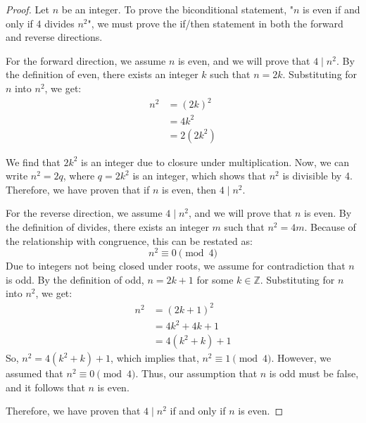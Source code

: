 \documentclass[12pt]{article}
\theoremstyle{definition}
\begin{document}
\begin{proof}
    Let \( n \) be an integer. To prove the biconditional statement, "\( n \) is even if and only if 4 divides \( n^2 \)", we must prove the if/then statement in both the forward and reverse directions.

    \vspace{1em}

    For the forward direction, we assume \( n \) is even, and we will prove that \( 4 \mid n^2 \). By the definition of even, there exists an integer \( k \) such that \( n = 2k \). Substituting for \( n \) into \( n^2 \), we get:
    \begin{align*}
        n^2 &= (2k)^2 \\
             &= 4k^2 \\
             &= 2(2k^2)
    \end{align*}

    We find that \( 2k^2 \) is an integer due to closure under multiplication. Now, we can write \( n^2 = 2q \), where \( q = 2k^2 \) is an integer, which shows that \( n^2 \) is divisible by 4. Therefore, we have proven that if \( n \) is even, then \( 4 \mid n^2 \).

    \vspace{1em}

    For the reverse direction, we assume \( 4 \mid n^2 \), and we will prove that \( n \) is even. By the definition of divides, there exists an integer \( m \) such that \( n^2 = 4m \). Because of the relationship with congruence, this can be restated as:
    \[ n^2 \equiv 0 \pmod{4} \]
    Due to integers not being closed under roots, we assume for contradiction that \( n \) is odd. By the definition of odd, \( n = 2k + 1 \) for some \( k \in \mathbb{Z} \). Substituting for \( n \) into \( n^2 \), we get:
    \begin{align*}
        n^2 &= (2k + 1)^2 \\
             &= 4k^2 + 4k + 1 \\
             &= 4(k^2 + k) + 1
    \end{align*}
    So, \( n^2 = 4(k^2 + k) + 1 \), which implies that, \( n^2 \equiv 1 \pmod{4} \). However, we assumed that \( n^2 \equiv 0 \pmod{4} \). Thus, our assumption that \( n \) is odd must be false, and it follows that \( n \) is even.

    \vspace{1em}
    
    Therefore, we have proven that \( 4 \mid n^2 \) if and only if \( n \) is even.
\end{proof}
 
\end{document}

